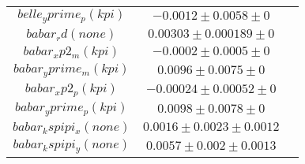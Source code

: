 \begin{table}[htdp]
\begin{center}
\begin{tabular}{|c|c|c|}
$belle_yprime_p(kpi)$ & $-0.0012\pm0.0058\pm0$ & \\
$babar_rd(none)$ & $0.00303\pm0.000189\pm0$ & \\
$babar_xp2_m(kpi)$ & $-0.0002\pm0.0005\pm0$ & \\
$babar_yprime_m(kpi)$ & $0.0096\pm0.0075\pm0$ & \\
$babar_xp2_p(kpi)$ & $-0.00024\pm0.00052\pm0$ & \\
$babar_yprime_p(kpi)$ & $0.0098\pm0.0078\pm0$ & \\
$babar_kspipi_x(none)$ & $0.0016\pm0.0023\pm0.0012$ & \\
$babar_kspipi_y(none)$ & $0.0057\pm0.002\pm0.0013$ & \\
\hline
\end{tabular}
\end{center}
\label{table:input/nodcpv/nodcpv_nobabar_inputs}
\end{table}

